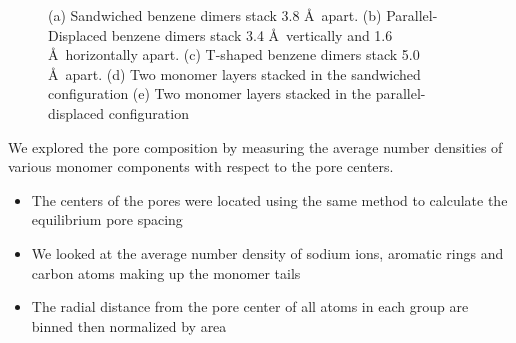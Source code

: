 \documentclass{article}
\newcommand{\angstrom}{\textup{\AA}}
\begin{document}
\begin{figure}
\begin{subfigure}[b]{0.475\textwidth}
		\caption{}\label{fig:offsetlayers}
	\end{subfigure}
	\caption{(a) Sandwiched benzene dimers stack 3.8 \angstrom~apart. (b) Parallel-Displaced benzene dimers stack
	3.4 \angstrom~vertically and 1.6 \angstrom~horizontally apart. (c) T-shaped benzene dimers stack 5.0 \angstrom~apart. 
	(d) Two monomer layers stacked in the sandwiched configuration (e) Two monomer layers stacked in the parallel-displaced
	configuration }\label{fig:stacking}
  \end{figure}
  
  We explored the pore composition by measuring the average number densities of
  various monomer components with respect to the pore centers.
  \begin{itemize}
	\item The centers of the pores were located using the same method to
        calculate the equilibrium pore spacing
        \item We looked at the average number density of sodium ions, aromatic
	rings and carbon atoms making up the monomer tails 
	\item The radial distance from the pore center of all atoms in each group
        are binned then normalized by area 
  \end{itemize}
\end{document}
